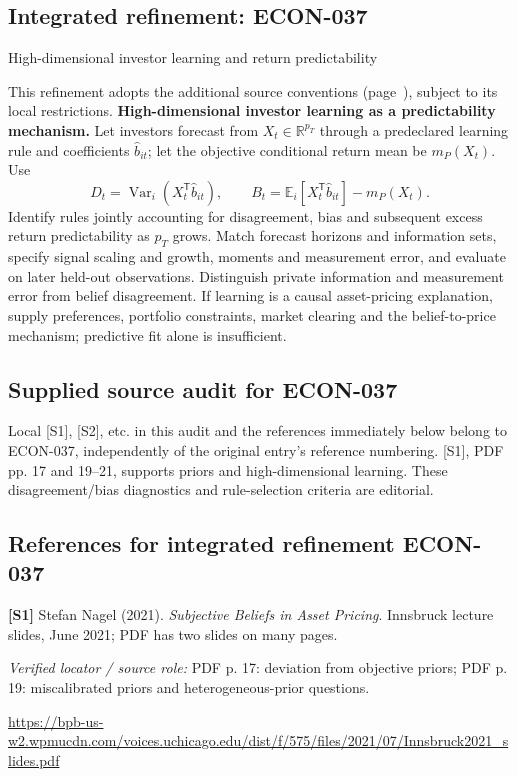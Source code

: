 \documentclass[11pt,a4paper]{article}
\begin{document}
\subsection*{Integrated refinement: ECON-037}
{\sffamily\small\color{muted}High-dimensional investor learning and return predictability\par}
This refinement adopts the additional source conventions
(page~\pageref{audited:conventions}), subject to its local restrictions.
\textbf{High-dimensional investor learning as a predictability mechanism.}
Let investors forecast from $X_t\in\mathbb R^{p_T}$ through a predeclared learning
rule and coefficients $\widehat b_{it}$; let the objective conditional return mean
be $m_P(X_t)$. Use
\[
D_t=\operatorname{Var}_i(X_t^{\mathsf T}\widehat b_{it}),\qquad
B_t=\mathbb E_i[X_t^{\mathsf T}\widehat b_{it}]-m_P(X_t).
\]
Identify rules jointly accounting for disagreement, bias and subsequent excess
return predictability as $p_T$ grows. Match forecast horizons and information
sets, specify signal scaling and growth, moments and measurement error, and
evaluate on later held-out observations. Distinguish private information and
measurement error from belief disagreement. If learning is a causal asset-pricing
explanation, supply preferences, portfolio constraints, market clearing and the
belief-to-price mechanism; predictive fit alone is insufficient.
\subsection*{Supplied source audit for ECON-037}
Local [S1], [S2], etc. in this audit and the references immediately below
belong to ECON-037, independently of the original entry's reference numbering.
[S1], PDF pp. 17 and 19--21, supports priors and high-dimensional learning. These disagreement/bias diagnostics and rule-selection criteria are editorial.
\subsection*{References for integrated refinement ECON-037}
{\footnotesize\raggedright
\par\noindent\textbf{[S1]} Stefan Nagel (2021). \emph{Subjective Beliefs in Asset Pricing}. Innsbruck lecture slides, June 2021; PDF has two slides on many pages.\par \textit{Verified locator / source role:} PDF p. 17: deviation from objective priors; PDF p. 19: miscalibrated priors and heterogeneous-prior questions.\par \url{https://bpb-us-w2.wpmucdn.com/voices.uchicago.edu/dist/f/575/files/2021/07/Innsbruck2021_slides.pdf}\par\smallskip
}
\end{document}
